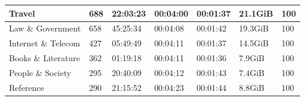 \begin{table}[]
\begin{tabular}{l|l|l|l|l|l|l}
Travel                                             & 688                                                 & 22:03:23                                                 & 00:04:00                                                & 00:01:37                                               & 21.1GiB                                              & 100                                                           \\ \hline
Law \& Government                                  & 658                                                 & 45:25:34                                                 & 00:04:08                                                & 00:01:42                                               & 19.3GiB                                              & 100                                                           \\ \hline
Internet \& Telecom                                & 427                                                 & 05:49:49                                                 & 00:04:11                                                & 00:01:37                                               & 14.5GiB                                              & 100                                                           \\ \hline
Books \& Literature                                & 362                                                 & 01:19:18                                                 & 00:04:11                                                & 00:01:36                                               & 7.9GiB                                               & 100                                                           \\ \hline
People \& Society                                  & 295                                                 & 20:40:09                                                 & 00:04:12                                                & 00:01:43                                               & 7.4GiB                                               & 100                                                           \\ \hline
Reference                                          & 290                                                 & 21:15:52                                                 & 00:04:23                                                & 00:01:44                                               & 8.8GiB                                               & 100                                                           \\ \hline

\end{tabular}
\end{table}
